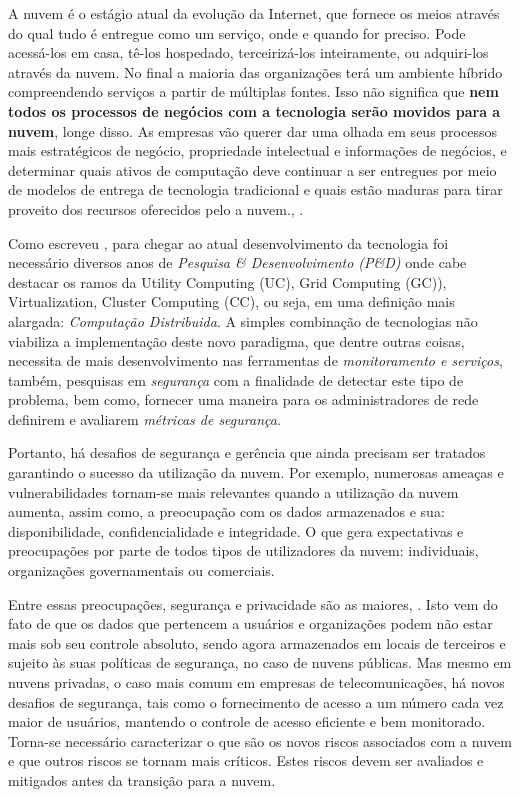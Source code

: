 \begin{citacao}
A nuvem é o estágio atual da evolução da Internet, que fornece os meios através
do qual tudo é entregue como um serviço, onde e quando for preciso. Pode
acessá-los em casa, tê-los hospedado, terceirizá-los inteiramente, ou
adquiri-los através da nuvem. No final a maioria das organizações terá um
ambiente híbrido compreendendo serviços a partir de múltiplas fontes. Isso não
significa que \textbf{nem todos os processos de negócios com a tecnologia serão
movidos para a nuvem}, longe disso. As empresas vão querer dar uma olhada em
seus processos mais estratégicos de negócio, propriedade intelectual e
informações de negócios, e determinar quais ativos de computação deve continuar
a ser entregues por meio de modelos de entrega de tecnologia tradicional e quais
estão maduras para tirar proveito dos recursos oferecidos pelo a nuvem.,
\cite[p.~3, grifo nosso]{Hurwitz2009}.
\end{citacao}

Como escreveu , para chegar ao atual desenvolvimento
da tecnologia foi necessário diversos anos de \textit{Pesquisa \&
Desenvolvimento (P\&D)} onde cabe destacar os ramos da \textsf{Utility Computing
(UC)}, \textsf{Grid Computing (GC))}, Virtualization, \textsf{Cluster Computing
(CC)}, ou seja, em uma definição mais alargada: \emph{Computação Distribuida}. A
simples combinação de tecnologias não viabiliza a implementação deste novo
paradigma, que dentre outras coisas, necessita de mais desenvolvimento nas
ferramentas de \emph{monitoramento e serviços}, também, pesquisas em
\emph{segurança} com a finalidade de detectar este tipo de problema, bem como,
fornecer uma maneira para os administradores de rede definirem e avaliarem
\emph{métricas de segurança}.

Portanto, há desafios de segurança e gerência que ainda precisam ser tratados
garantindo o sucesso da utilização da nuvem. Por exemplo, numerosas ameaças e
vulnerabilidades tornam-se mais relevantes quando a utilização da nuvem aumenta,
assim como, a preocupação com os dados armazenados e sua:
\textsf{disponibilidade}, \textsf{confidencialidade} e \textsf{integridade}. O
que gera expectativas e preocupações por parte de todos tipos de utilizadores da
nuvem: individuais, organizações governamentais ou comerciais.


Entre essas preocupações, segurança e privacidade são as
maiores, . Isto vem do fato de que os dados que
pertencem a usuários e organizações podem não estar mais sob seu controle
absoluto, sendo agora armazenados em locais de terceiros e sujeito às suas
políticas de segurança, no caso de nuvens públicas. Mas mesmo em nuvens
privadas, o caso mais comum em empresas de telecomunicações, há novos desafios
de segurança, tais como o fornecimento de acesso a um número cada vez maior de
usuários, mantendo o controle de acesso eficiente e bem monitorado.
Torna-se necessário caracterizar o que são os novos riscos associados com a
nuvem e que outros riscos se tornam mais críticos. Estes riscos devem ser
avaliados e mitigados antes da transição para a nuvem.

